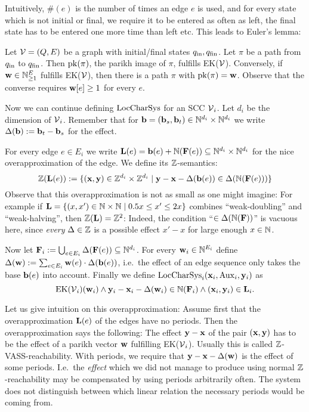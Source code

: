 Intuitively, \(\#(e)\) is the number of times an edge \(e\) is used, and for every state which is not initial or final, we require it to be entered as often as left, the final state has to be entered one more time than left etc. This leads to Euler's lemma:

\begin{lemma} \label{LemmaBasicEulerKirchhoff}
Let \(\operatorname{\mathcal{V}}=(Q,E)\) be a graph with initial/final states \(q_{\text{in}}, q_{\text{fin}}\). Let \(\pi\) be a path from \(q_{\text{in}}\) to \(q_{\text{fin}}\). Then \(\operatorname{pk}(\pi)\), the parikh image of \(\pi\), fulfills EK(\(\operatorname{\mathcal{V}}\)). Conversely, if \(\mathbf{w} \in \mathbb{N}_{\geq 1}^E\) fulfills EK(\(\operatorname{\mathcal{V}}\)), then there is a path \(\pi\) with \(\operatorname{pk}(\pi)=\mathbf{w}\). Observe that the converse requires \(\mathbf{w}[e]\geq 1\) for every \(e\).
\end{lemma}

Now we can continue defining \(\operatorname{LocCharSys}\) for an SCC \(\operatorname{\mathcal{V}}_i\). Let \(d_i\) be the dimension of \(\operatorname{\mathcal{V}}_i\). Remember that for \(\mathbf{b}=(\mathbf{b}_s, \mathbf{b}_t) \in \mathbb{N}^{d_i} \times \mathbb{N}^{d_i}\) we write \(\operatorname{\operatorname{\Delta}}(\mathbf{b}):=\mathbf{b}_t-\mathbf{b}_s\) for the effect.

For every edge \(e \in E_i\) we write \(\mathbf{L}(e)=\mathbf{b}(e)+\mathbb{N}(\mathbf{F}(e)) \subseteq \mathbb{N}^{d_i} \times \mathbb{N}^{d_i}\) for the nice overapproximation of the edge. We define its \(\mathbb{Z}\)-semantics:
\[\mathbb{Z}(\mathbf{L}(e)):=\{(\mathbf{x}, \mathbf{y}) \in \mathbb{Z}^{d_i} \times \mathbb{Z}^{d_i} \mid \mathbf{y}-\mathbf{x}-\Delta(\mathbf{b}(e)) \in \Delta(\mathbb{N}(\mathbf{F}(e)))\}\] Observe that this overapproximation is not as small as one might imagine: For example if \(\mathbf{L}=\{(x,x') \in \mathbb{N} \times \mathbb{N} \mid 0.5 x \leq x' \leq 2x\}\) combines ``weak-doubling'' and ``weak-halving'', then \(\mathbb{Z}(\mathbf{L})=\mathbb{Z}^2\): Indeed, the condition ``\(\in \Delta(\mathbb{N}(\mathbf{F}))\)'' is vacuous here, since \emph{every} \(\Delta \in \mathbb{Z}\) is a possible effect \(x'-x\) for large enough \(x \in \mathbb{N}\). 

Now let \(\mathbf{F}_i:=\bigcup_{e \in E_i} \operatorname{\operatorname{\Delta}}(\mathbf{F}(e)) \subseteq \mathbb{N}^{d_i}\). For every \(\mathbf{w}_i \in \mathbb{N}^{E_i}\) define \(\operatorname{\operatorname{\Delta}}(\mathbf{w}):=\sum_{e \in E_i}\mathbf{w}(e) \cdot \operatorname{\operatorname{\Delta}}(\mathbf{b}(e))\), i.e.\ the effect of an edge sequence only takes the base \(\mathbf{b}(e)\) into account. Finally we define \(\operatorname{LocCharSys}_i(\mathbf{x}_i, \operatorname{Aux}_i, \mathbf{y}_i)\) as \[\text{EK}(\operatorname{\mathcal{V}}_i)(\mathbf{w}_i) \wedge \mathbf{y}_i-\mathbf{x}_i-\operatorname{\operatorname{\Delta}}(\mathbf{w}_i) \in \mathbb{N}(\mathbf{F}_i) \wedge (\mathbf{x}_i, \mathbf{y}_i) \in \mathbf{L}_i.\]

Let us give intuition on this overapproximation: Assume first that the overapproximation \(\mathbf{L}(e)\) of the edges have no periods. Then the overapproximation says the following: The effect \(\mathbf{y}-\mathbf{x}\) of the pair \((\mathbf{x}, \mathbf{y})\) has to be the effect of a parikh vector \(\mathbf{w}\) fulfilling EK(\(\operatorname{\mathcal{V}}_i\)). Usually this is called \(\mathbb{Z}\)-VASS-reachability. With periods, we require that \(\mathbf{y}-\mathbf{x}-\operatorname{\operatorname{\Delta}}(\mathbf{w})\) is the effect of some periods. I.e.\ the \emph{effect} which we did not manage to produce using normal \(\mathbb{Z}\)-reachability may be compensated by using periods arbitrarily often. The system does not distinguish between which linear relation the necessary periods would be coming from. 

